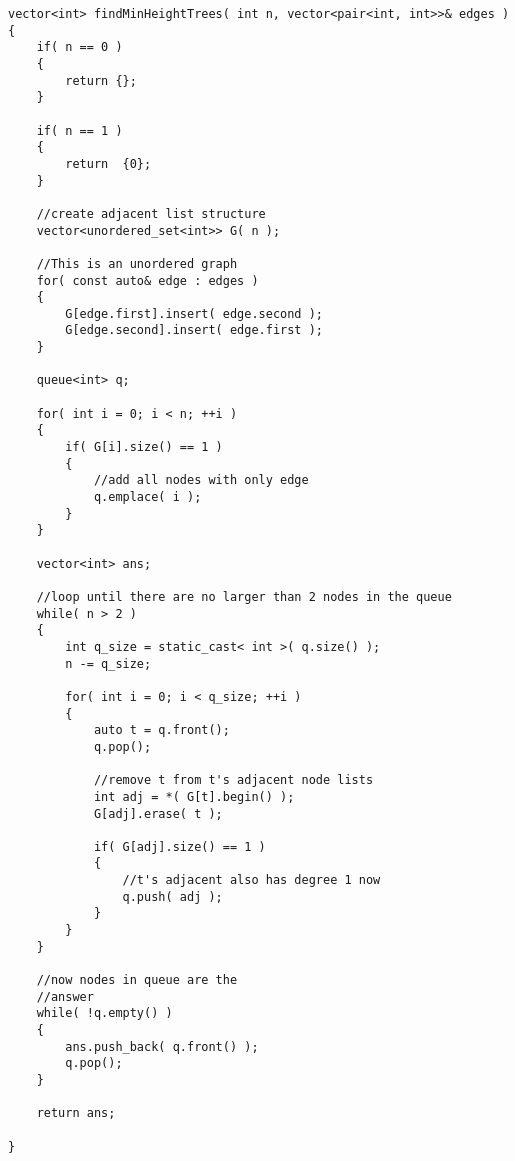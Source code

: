 \begin{lstlisting}[style=customc, caption={Breadth First Search}]
vector<int> findMinHeightTrees( int n, vector<pair<int, int>>& edges )
{
    if( n == 0 )
    {
        return {};
    }

    if( n == 1 )
    {
        return  {0};
    }

    //create adjacent list structure
    vector<unordered_set<int>> G( n );

    //This is an unordered graph
    for( const auto& edge : edges )
    {
        G[edge.first].insert( edge.second );
        G[edge.second].insert( edge.first );
    }

    queue<int> q;

    for( int i = 0; i < n; ++i )
    {
        if( G[i].size() == 1 )
        {
            //add all nodes with only edge
            q.emplace( i );
        }
    }

    vector<int> ans;

    //loop until there are no larger than 2 nodes in the queue
    while( n > 2 )
    {
        int q_size = static_cast< int >( q.size() );
        n -= q_size;

        for( int i = 0; i < q_size; ++i )
        {
            auto t = q.front();
            q.pop();

            //remove t from t's adjacent node lists
            int adj = *( G[t].begin() );
            G[adj].erase( t );

            if( G[adj].size() == 1 )
            {
                //t's adjacent also has degree 1 now
                q.push( adj );
            }
        }
    }

    //now nodes in queue are the
    //answer
    while( !q.empty() )
    {
        ans.push_back( q.front() );
        q.pop();
    }

    return ans;

}

\end{lstlisting}
